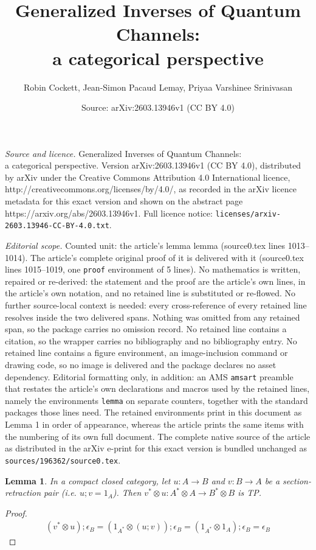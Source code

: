 \documentclass[10pt,a4paper]{amsart}
\title{Generalized Inverses of Quantum Channels: \\a categorical perspective}
\author{Robin Cockett, Jean-Simon Pacaud Lemay, Priyaa Varshinee Srinivasan}
\date{Source: arXiv:2603.13946v1 (CC BY 4.0)}
\newtheorem{lemma}{Lemma}
\begin{document}
\maketitle

\noindent\emph{Source and licence.} Generalized Inverses of Quantum Channels: \\a categorical perspective. Version arXiv:2603.13946v1 (CC BY 4.0), distributed by arXiv under the Creative Commons Attribution 4.0 International licence, http://creativecommons.org/licenses/by/4.0/, as recorded in the arXiv licence metadata for this exact version and shown on the abstract page https://arxiv.org/abs/2603.13946v1. Full licence notice: \texttt{licenses/arxiv-2603.13946-CC-BY-4.0.txt}.\par\smallskip

\noindent\textit{Editorial scope.} Counted unit: the article's lemma lemma (source0.tex lines 1013--1014). The article's complete original proof of it is delivered with it (source0.tex lines 1015--1019, one \texttt{proof} environment of 5 lines). No mathematics is written, repaired or re-derived: the statement and the proof are the article's own lines, in the article's own notation, and no retained line is substituted or re-flowed.  No further source-local context is needed: every cross-reference of every retained line resolves inside the two delivered spans.  Nothing was omitted from any retained span, so the package carries no omission record.  No retained line contains a citation, so the wrapper carries no bibliography and no bibliography entry.  No retained line contains a figure environment, an image-inclusion command or drawing code, so no image is delivered and the package declares no asset dependency.  Editorial formatting only, in addition: an AMS \texttt{amsart} preamble that restates the article's own declarations and macros used by the retained lines, namely the environments \texttt{lemma} on separate counters, together with the standard packages those lines need.  The retained environments print in this document as Lemma 1 in order of appearance, whereas the article prints the same items with the numbering of its own full document.  The complete native source of the article as distributed in the arXiv e-print for this exact version is bundled unchanged as \texttt{sources/196362/source0.tex}.
\begin{lemma} In a compact closed category, let $u: A \to B$ and $v: B \to A$ be a section-retraction pair (i.e. $u;v = 1_A$). Then $v^\ast \otimes u: A^\ast \otimes A \to B^\ast \otimes B$ is TP. 
\end{lemma}

\begin{proof} 
\begin{align*}
   (v^\ast \otimes u); \epsilon_B = \left( 1_{A^\ast} \otimes (u;v) \right); \epsilon_B = (1_{A^\ast} \otimes 1_A); \epsilon_B = \epsilon_B
\end{align*}
\end{proof}
\end{document}
